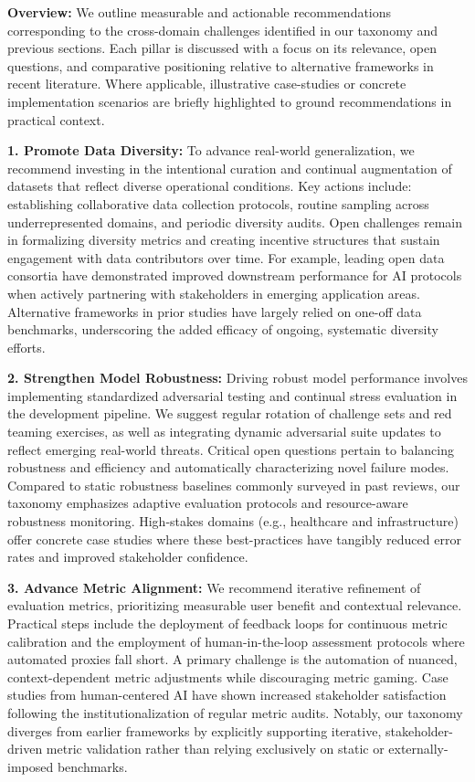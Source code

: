 \documentclass[sigconf]{acmart}
\begin{document}
\vspace{1.5ex}
\noindent\textbf{Overview:} We outline measurable and actionable recommendations corresponding to the cross-domain challenges identified in our taxonomy and previous sections. Each pillar is discussed with a focus on its relevance, open questions, and comparative positioning relative to alternative frameworks in recent literature. Where applicable, illustrative case-studies or concrete implementation scenarios are briefly highlighted to ground recommendations in practical context.

\vspace{1.5ex}
\textbf{1. Promote Data Diversity:} 
To advance real-world generalization, we recommend investing in the intentional curation and continual augmentation of datasets that reflect diverse operational conditions. Key actions include: establishing collaborative data collection protocols, routine sampling across underrepresented domains, and periodic diversity audits. Open challenges remain in formalizing diversity metrics and creating incentive structures that sustain engagement with data contributors over time. For example, leading open data consortia have demonstrated improved downstream performance for AI protocols when actively partnering with stakeholders in emerging application areas. Alternative frameworks in prior studies have largely relied on one-off data benchmarks, underscoring the added efficacy of ongoing, systematic diversity efforts.

\vspace{1ex}
\textbf{2. Strengthen Model Robustness:}
Driving robust model performance involves implementing standardized adversarial testing and continual stress evaluation in the development pipeline. We suggest regular rotation of challenge sets and red teaming exercises, as well as integrating dynamic adversarial suite updates to reflect emerging real-world threats. Critical open questions pertain to balancing robustness and efficiency and automatically characterizing novel failure modes. Compared to static robustness baselines commonly surveyed in past reviews, our taxonomy emphasizes adaptive evaluation protocols and resource-aware robustness monitoring. High-stakes domains (e.g., healthcare and infrastructure) offer concrete case studies where these best-practices have tangibly reduced error rates and improved stakeholder confidence.

\vspace{1ex}
\textbf{3. Advance Metric Alignment:}
We recommend iterative refinement of evaluation metrics, prioritizing measurable user benefit and contextual relevance. Practical steps include the deployment of feedback loops for continuous metric calibration and the employment of human-in-the-loop assessment protocols where automated proxies fall short. A primary challenge is the automation of nuanced, context-dependent metric adjustments while discouraging metric gaming. Case studies from human-centered AI have shown increased stakeholder satisfaction following the institutionalization of regular metric audits. Notably, our taxonomy diverges from earlier frameworks by explicitly supporting iterative, stakeholder-driven metric validation rather than relying exclusively on static or externally-imposed benchmarks.
\end{document}
